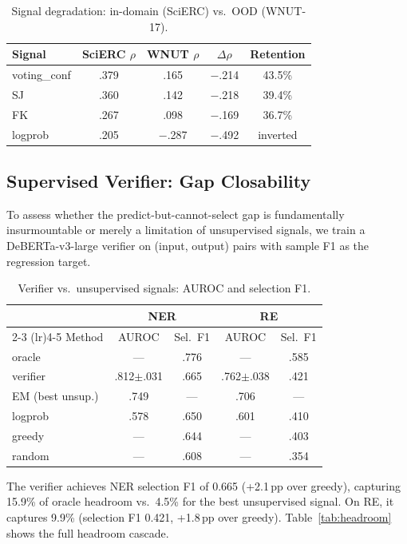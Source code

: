 \documentclass[11pt,a4paper]{article}
\begin{document}
\begin{table}[t]
\centering
\small
\caption{Signal degradation: in-domain (SciERC) vs.\ OOD (WNUT-17).}
\label{tab:degradation}
\begin{tabular}{lcccc}
\toprule
Signal & SciERC $\rho$ & WNUT $\rho$ & $\Delta\rho$ & Retention \\
\midrule
voting\_conf & .379 & .165 & $-$.214 & 43.5\% \\
SJ & .360 & .142 & $-$.218 & 39.4\% \\
FK & .267 & .098 & $-$.169 & 36.7\% \\
logprob & .205 & $-$.287 & $-$.492 & inverted \\
\bottomrule
\end{tabular}
\end{table}

\subsection{Supervised Verifier: Gap Closability}
\label{sec:verifier}

To assess whether the predict-but-cannot-select gap is fundamentally insurmountable or merely a limitation of unsupervised signals, we train a DeBERTa-v3-large verifier on (input, output) pairs with sample F1 as the regression target.

\begin{table}[t]
\centering
\small
\caption{Verifier vs.\ unsupervised signals: AUROC and selection F1.}
\label{tab:verifier}
\begin{tabular}{lcccc}
\toprule
& \multicolumn{2}{c}{\textbf{NER}} & \multicolumn{2}{c}{\textbf{RE}} \\
\cmidrule(lr){2-3} \cmidrule(lr){4-5}
Method & AUROC & Sel.\ F1 & AUROC & Sel.\ F1 \\
\midrule
oracle & --- & .776 & --- & .585 \\
verifier & .812{\tiny$\pm$.031} & .665 & .762{\tiny$\pm$.038} & .421 \\
EM (best unsup.) & .749 & --- & .706 & --- \\
logprob & .578 & .650 & .601 & .410 \\
greedy & --- & .644 & --- & .403 \\
random & --- & .608 & --- & .354 \\
\bottomrule
\end{tabular}
\end{table}

The verifier achieves NER selection F1 of 0.665 (+2.1\,pp over greedy), capturing 15.9\% of oracle headroom vs.\ 4.5\% for the best unsupervised signal. On RE, it captures 9.9\% (selection F1 0.421, +1.8\,pp over greedy). Table~\ref{tab:headroom} shows the full headroom cascade.
\end{document}
